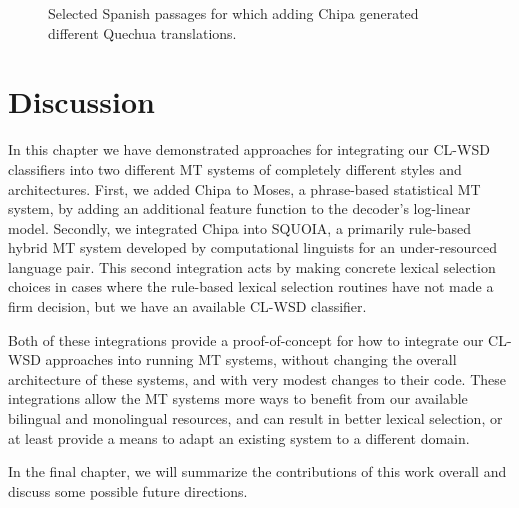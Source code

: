 \begin{figure}
\label{sent:putyourhand}

\label{sent:alreadydead}

\label{sent:burning}

\label{sent:reins}

\label{sent:llama}
  \caption{Selected Spanish passages for which adding Chipa generated different
  Quechua translations.}
  \label{fig:some-spanish-verses-with-changes}
\end{figure}

\section{Discussion}
In this chapter we have demonstrated approaches for integrating our CL-WSD
classifiers into two different MT systems of completely different styles and
architectures. First, we added Chipa to Moses, a phrase-based statistical MT
system, by adding an additional feature function to the decoder's log-linear
model. Secondly, we integrated Chipa into SQUOIA, a primarily rule-based hybrid
MT system developed by computational linguists for an under-resourced language
pair. This second integration acts by making concrete lexical selection choices
in cases where the rule-based lexical selection routines have not made a firm
decision, but we have an available CL-WSD classifier.

Both of these integrations provide a proof-of-concept for how to integrate our
CL-WSD approaches into running MT systems, without changing the overall
architecture of these systems, and with very modest changes to their code. These
integrations allow the MT systems more ways to benefit from our available
bilingual and monolingual resources, and can result in better lexical
selection, or at least provide a means to adapt an existing system to a
different domain.

In the final chapter, we will summarize the contributions of this work overall
and discuss some possible future directions.
